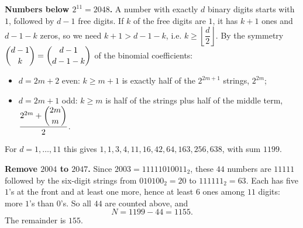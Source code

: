 \textbf{Numbers below $2^{11}=2048$.} A number with exactly $d$ binary digits starts with $1$, followed by $d-1$ free digits. If $k$ of the free digits are $1$, it has $k+1$ ones and $d-1-k$ zeros, so we need $k+1>d-1-k$, i.e. $k\ge\left\lfloor\dfrac {d}{2}\right\rfloor$. By the symmetry $\dbinom{d-1}{k}=\dbinom{d-1}{d-1-k}$ of the binomial coefficients:
\begin{itemize}
\item $d=2m+2$ even: $k\ge m+1$ is exactly half of the $2^{2m+1}$ strings, $2^{2m}$;
\item $d=2m+1$ odd: $k\ge m$ is half of the strings plus half of the middle term, $\dfrac{2^{2m}+\dbinom{2m}{m}}{2}$.
\end{itemize}
For $d=1,\dots,11$ this gives $1,1,3,4,11,16,42,64,163,256,638$, with sum $1199$.

\textbf{Remove $2004$ to $2047$.} Since $2003=11111010011_2$, these $44$ numbers are $11111$ followed by the six-digit strings from $010100_2=20$ to $111111_2=63$. Each has five $1$'s at the front and at least one more, hence at least $6$ ones among $11$ digits: more $1$'s than $0$'s. So all $44$ are counted above, and
\[N=1199-44=1155.\]
The remainder is $\boxed{155}$.
